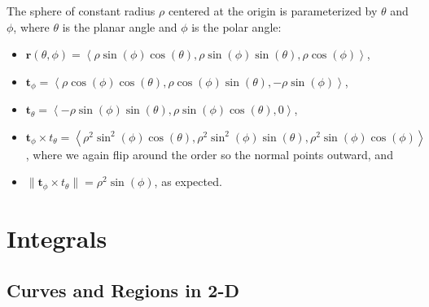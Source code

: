 \documentclass[10pt]{article}
\newcommand{\mb}[1]{\mathbf{#1}}
\newcommand{\brackett}[1]{\left\langle #1 \right\rangle}
\newcommand{\vecfuc}[2]{\mb{#1}(#2)}
\begin{document}
The sphere of constant radius \(\rho\) centered at the origin is parameterized by \(\theta\) and \(\phi\), where \(\theta\) is the planar angle and \(\phi\) is the polar angle:
\begin{itemize}
    \item \(\vecfuc{r}{\theta,\phi} = \brackett{\rho \sin(\phi) \cos(\theta), \rho \sin(\phi) \sin(\theta), \rho \cos(\phi)}\),
    \item \(\mb{t}_{\phi} = \brackett{\rho \cos(\phi) \cos(\theta), \rho \cos(\phi) \sin(\theta), -\rho \sin(\phi)}\),
    \item \(\mb{t}_{\theta} = \brackett{-\rho \sin(\phi) \sin(\theta), \rho \sin(\phi) \cos(\theta), 0}\),
    \item \(\mb{t}_{\phi} \times t_{\theta} = \brackett{\rho^{2} \sin^{2}(\phi) \cos(\theta), \rho^{2} \sin^{2}(\phi) \sin(\theta), \rho^{2} \sin(\phi)\cos(\phi)}\), where we again flip around the order so the normal points outward, and
    \item \(\| \mb{t}_{\phi} \times t_{\theta} \| = \rho^{2} \sin(\phi)\), as expected.
\end{itemize}

\newpage

\section*{Integrals}

\subsection*{Curves and Regions in 2-D}
\end{document}
